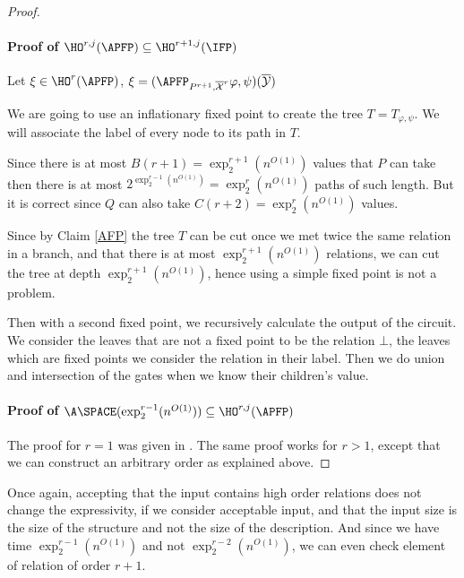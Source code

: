 \documentclass[a4paper,12pt]{article}
\theoremstyle{definition}
\renewcommand{\phi}{\varphi}
\newcommand{\hoa}[1]{\ensuremath{\HO^{#1}}}
\newcommand{\hod}[2]{\ensuremath{\HO^{#1,#2}}}
\newcommand{\ex}[1]{\ensuremath{\exp_{2}^{#1}(n^{O(1)})}}
\newcommand{\olmc}[1]{\overline{\mathcal{#1}}}
\begin{document}
\begin{proof}
 \paragraph{ Proof of
   $\hod   rj(\APFP)\subseteq\hod{r+1}j(\IFP)$}
  Let $\xi\in\hoa r(\APFP)$, $\xi=(\APFP_{P^{r+1},\olmc
    X^{r}}\phi,\psi)(\olmc Y)$

  We are going to use an inflationary fixed point to create the tree
  $T=T_{\phi,\psi}$. We will associate the label of every node to its
  path in $T$.

  Since there is at most $B(r+1)=\ex{r+1}$ values that $P$ can take
  then there is at most $2^{\ex{r-1}}=\ex{r}$ paths of such length.
  But it is correct since $Q$ can also take $C(r+2)=\ex{r}$ values.

  Since by Claim \ref{AFP} the tree $T$ can be cut once we met twice
  the same relation in a branch, and that there is at most $\ex{r+1}$
  relations, we can cut the tree at depth $\ex{r+1}$, hence using a
  simple fixed point is not a problem. 



  Then with a second fixed point, we recursively calculate the output
  of the circuit. We consider the leaves that are not a fixed point to
  be the relation $\bot$, the leaves which are fixed points we
  consider the relation in their label. Then we do union and
  intersection of the gates when we know their children's value.



 \paragraph{ Proof of
   $\A\SPACE(\exp^{r-1}_2(n^{O(1)}))\subseteq\hod  rj(\APFP)$}
 The proof for $r=1$ was given in \cite{nfp}. The same proof works for
 $r>1$, except that we can construct an arbitrary order as explained
 above. 





\end{proof}

Once again, accepting that the input contains high order relations does
not change the expressivity, if we consider acceptable input, and that the
input size is the size of the structure and not the size of the
description. And since we have time $\exp_{2}^{r-1}(n^{O(1)})$ and not
$\exp_{2}^{r-2}(n^{O(1)})$, we can even check element of relation of
order $r+1$.
\end{document}
